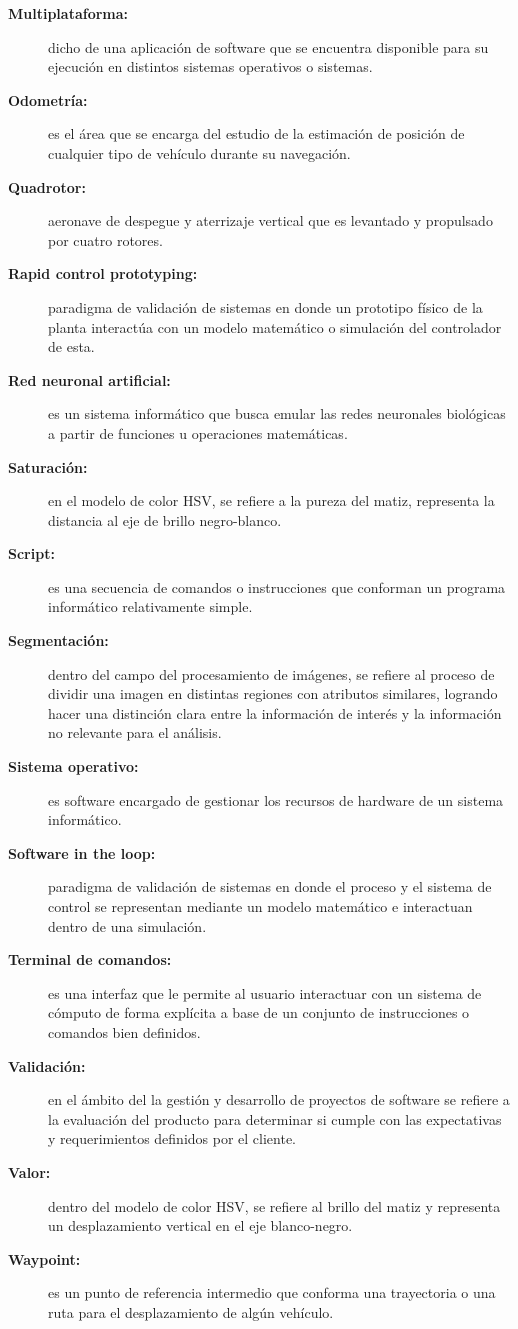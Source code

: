 \begin{description}
  \item[\textbf{Multiplataforma:}] dicho de una aplicación de software que se encuentra disponible para su ejecución en distintos sistemas operativos o sistemas.
  \item[\textbf{Odometría:}] es el área que se encarga del estudio de la estimación de posición de cualquier tipo de vehículo durante su navegación.
  \item[\textbf{Quadrotor:}] aeronave de despegue y aterrizaje vertical que es levantado y propulsado por cuatro rotores.
  \item[\textbf{Rapid control prototyping:}] paradigma de validación de sistemas en donde un prototipo físico de la planta interactúa con un modelo matemático o simulación del controlador de esta.
  \item[\textbf{Red neuronal artificial:}] es un sistema informático que busca emular las redes neuronales biológicas a partir de funciones u operaciones matemáticas.
  \item[\textbf{Saturación:}] en el modelo de color HSV, se refiere a la pureza del matiz, representa la distancia al eje de brillo negro-blanco.
  \item[\textbf{Script:}]  es una secuencia de comandos o instrucciones que conforman un programa informático relativamente simple.
  \item[\textbf{Segmentación:}] dentro del campo del procesamiento de imágenes, se refiere al proceso de dividir una imagen en distintas regiones con atributos similares, logrando hacer una distinción clara entre la información de interés y la información no relevante para el análisis.
  \item[\textbf{Sistema operativo:}] es software encargado de gestionar los recursos de hardware de un sistema informático.
  \item[\textbf{Software in the loop:}] paradigma de validación de sistemas en donde el proceso y el sistema de control se representan mediante un modelo matemático e interactuan dentro de una simulación.
  \item[\textbf{Terminal de comandos:}] es una interfaz que le permite al usuario interactuar con un sistema de cómputo de forma explícita a base de un conjunto de instrucciones o comandos bien definidos.
  \item[\textbf{Validación:}] en el ámbito del la gestión y desarrollo de proyectos de software se refiere a la evaluación del producto para determinar si cumple con las expectativas y requerimientos definidos por el cliente.
  \item[\textbf{Valor:}] dentro del modelo de color HSV, se refiere al brillo del matiz y representa un desplazamiento vertical en el eje blanco-negro.
  \item[\textbf{Waypoint:}] es un punto de referencia intermedio que conforma una trayectoria o una ruta para el desplazamiento de algún vehículo.
                        
\end{description}
\clearpage

